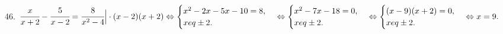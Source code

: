 46. $\cfrac{x}{x+2}-\cfrac{5}{x-2}=\cfrac{8}{x^2-4}\Big|\cdot(x-2)(x+2)\Leftrightarrow\begin{cases}x^2-2x-5x-10=8,\\x
eq\pm2.\end{cases}
\Leftrightarrow\begin{cases}x^2-7x-18=0,\\x
eq\pm2.\end{cases}\Leftrightarrow\begin{cases}(x-9)(x+2)=0,\\x
eq\pm2.\end{cases}\Leftrightarrow x=9.$\\
